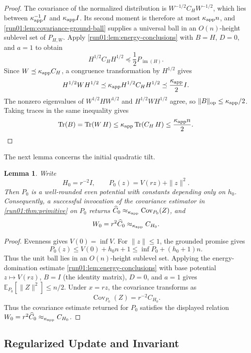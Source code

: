 \documentclass[11pt]{article}
\numberwithin{equation}{section}
\newtheorem{lemma}{Lemma}[section]
\theoremstyle{definition}
\newcommand{\E}[2]{\mathbb{E}_{#1}\left[#2\right]}
\begin{document}
\begin{proof}
The covariance of the normalized distribution is $W^{-1/2}C_HW^{-1/2}$, which
lies between
$\kappa_{\rm app}^{-1}I$ and
$\kappa_{\rm app}I$.
Its second moment is therefore at most $\kappa_{\rm app}n$, and
\cref{run01:lem:covariance-ground-ball} supplies a universal ball in an
$O(n)$-height sublevel set of
$P_{H,W}$.
Apply \cref{run01:lem:energy-conclusions} with $B=H$,
$D=0$, and
$a=1$ to obtain
\[
 H^{1/2}C_HH^{1/2}\preceq\frac12P_{\operatorname{im}(H)}.
\]
Since $W\preceq\kappa_{\rm app}C_H$, a congruence transformation by
$H^{1/2}$ gives
\[
H^{1/2}WH^{1/2}
\preceq\kappa_{\rm app}H^{1/2}C_HH^{1/2}
\preceq\frac{\kappa_{\rm app}}2I.
\]
The nonzero eigenvalues of $W^{1/2}HW^{1/2}$ and
$H^{1/2}WH^{1/2}$ agree, so
$\|B\|_{\mathrm{op}}\leq\kappa_{\rm app}/2$.
Taking traces in the same inequality gives
\[
\operatorname{Tr}(B)
=\operatorname{Tr}(W\,H)
\leq\kappa_{\rm app}\operatorname{Tr}(C_H\,H)
\leq\frac{\kappa_{\rm app}n}{2}.
\]
\end{proof}

The next lemma concerns the initial quadratic tilt.

\begin{lemma}
\label{run01:lem:cold-local}
Write
\[
H_0=r^{-2}I,
\qquad
P_0(z)=V(rz)+\|z\|^2.
\]
Then $P_0$ is a well-rounded even potential with constants depending only on
$h_0$.
Consequently, a successful invocation of the covariance estimator in
\cref{run01:thm:primitive} on $P_0$ returns
$\widehat C_0\approx_{\kappa_{\rm app}}\operatorname{Cov}_{P_0}(Z)$, and
\[
W_0
=r^2\widehat C_0
\approx_{\kappa_{\rm app}}C_{H_0}.
\]
\end{lemma}

\begin{proof}
Evenness gives $V(0)=\inf V$.
For $\|z\|\leq1$, the grounded promise gives
\[
P_0(z)
\leq V(0)+h_0n+1
\leq\inf P_0+(h_0+1)n.
\]
Thus the unit ball lies in an $O(n)$-height sublevel set.
Applying the energy-domination estimate \cref{run01:lem:energy-conclusions} with
base potential $z\mapsto V(rz)$,
$B=I$ (the identity matrix),
$D=0$, and
$a=1$ gives
$\E{P_0}{\|Z\|^2}\leq n/2$.
Under $x=rz$, the covariance transforms as
\[
 \operatorname{Cov}_{P_0}(Z)=r^{-2}C_{H_0}.
\]
Thus the covariance estimate returned for $P_0$ satisfies the displayed relation
$W_0=r^2\widehat C_0\approx_{\kappa_{\rm app}}C_{H_0}$.
\end{proof}
\space

\subsection{Regularized Update and Invariant}
\label{sec:symmetric-invariant}
\end{document}
